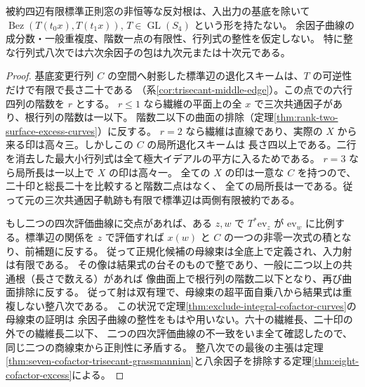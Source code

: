 \begin{theorem}\label{thm:unrestricted-bezout-exclusion}
被約四辺有限標準正則窓の非恒等な反対根は、入出力の基底を除いて
$\operatorname{Bez}(T(t_0x),T(t_1x))$, $T\in\operatorname{GL}(S_4)$ という形を持たない。
余因子曲線の成分数・一般重複度、階数一点の有限性、行列式の整性を仮定しない。
特に整な行列式八次では六次余因子の包は九次元または十次元である。
\end{theorem}
\begin{proof}
基底変更行列 $C$ の空間へ射影した標準辺の退化スキームは、$T$ の可逆性だけで有限で長さ二十である
（系\ref{cor:trisecant-middle-edge}）。この点での六行四列の階数を $r$ とする。
$r\le1$ なら繊維の平面上の全 $x$ で三次共通因子があり、根行列の階数は一以下。
階数二以下の曲面の排除（定理\ref{thm:rank-two-surface-excess-curves}）に反する。
$r=2$ なら繊維は直線であり、実際の $X$ から来る印は高々三。しかしこの $C$ の局所退化スキームは
長さ四以上である。二行を消去した最大小行列式は全て極大イデアルの平方に入るためである。
$r=3$ なら局所長は一以上で $X$ の印は高々一。
全ての $X$ の印は一意な $C$ を持つので、二十印と総長二十を比較すると階数二点はなく、
全ての局所長は一である。従って元の三次共通因子軌跡も有限で標準辺は両側有限被約である。

もし二つの四次評価曲線に交点があれば、ある $z,w$ で $T^*\mathrm{ev}_z$ が
$\mathrm{ev}_w$ に比例する。標準辺の関係を $z$ で評価すれば
$x(w)$ と $C$ の一つの非零一次式の積となり、前補題に反する。
従って正規化候補の母線束は全底上で定義され、入力射は有限である。
その像は結果式の台そのもので整であり、一般に二つ以上の共通根（長さで数える）があれば
像曲面上で根行列の階数二以下となり、再び曲面排除に反する。
従って射は双有理で、母線束の超平面自乗八から結果式は重複しない整八次である。
この状況で定理\ref{thm:exclude-integral-cofactor-curves}の母線束の証明は
余因子曲線の整性をもはや用いない。六十の繊維長、二十印の外での繊維長二以下、
二つの四次評価曲線の不一致をいま全て確認したので、同じ二つの商線束から正則性に矛盾する。
整八次での最後の主張は定理\ref{thm:seven-cofactor-trisecant-grassmannian}と八余因子を排除する定理\ref{thm:eight-cofactor-excess}による。
\end{proof}

